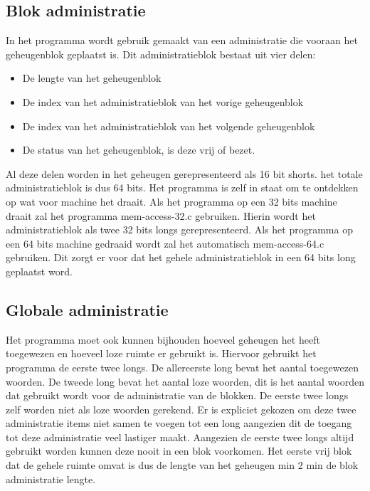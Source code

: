\documentclass[a4paper]{article}
\begin{document}
		\subsection{Blok administratie}\label{sec:programmablok}
			In het programma wordt gebruik gemaakt van een administratie die vooraan het geheugenblok geplaatst is. Dit administratieblok bestaat uit vier delen:
			\begin{itemize}
				\item De lengte van het geheugenblok
				\item De index van het administratieblok van het vorige geheugenblok
				\item De index van het administratieblok van het volgende geheugenblok
				\item De status van het geheugenblok, is deze vrij of bezet.
			\end{itemize}
			Al deze delen worden in het geheugen gerepresenteerd als 16 bit shorts. het totale administratieblok is dus 64 bits.
			Het programma is zelf in staat om te ontdekken op wat voor machine het draait.
			Als het programma op een 32 bits machine draait zal het programma mem-access-32.c gebruiken.
			Hierin wordt het administratieblok als twee 32 bits longs gerepresenteerd.
			Als het programma op een 64 bits machine gedraaid wordt zal het automatisch mem-access-64.c gebruiken.
			Dit zorgt er voor dat het gehele administratieblok in een 64 bits long geplaatst word.
		
		\subsection{Globale administratie}\label{sec:programmaglobaal}
			Het programma moet ook kunnen bijhouden hoeveel geheugen het heeft toegewezen en hoeveel loze ruimte er gebruikt is.
			Hiervoor gebruikt het programma de eerste twee longs. De allereerste long bevat het aantal toegewezen woorden.
			De tweede long bevat het aantal loze woorden, dit is het aantal woorden dat gebruikt wordt voor de administratie van de blokken.
			De eerste twee longs zelf worden niet als loze woorden gerekend.
			Er is expliciet gekozen om deze twee administratie items niet samen te voegen tot een long aangezien dit de toegang tot deze administratie veel lastiger maakt.
			Aangezien de eerste twee longs altijd gebruikt worden kunnen deze nooit in een blok voorkomen.
			Het eerste vrij blok dat de gehele ruimte omvat is dus de lengte van het geheugen min 2 min de blok administratie lengte.
		
\end{document}
